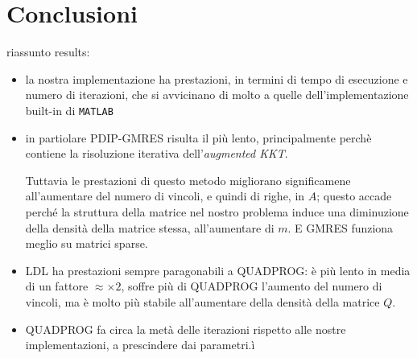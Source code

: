 \section{Conclusioni}
riassunto results:
\begin{itemize}
    \item la nostra implementazione ha prestazioni, in termini di tempo di esecuzione e numero di iterazioni, che si avvicinano di molto a quelle dell'implementazione built-in di \texttt{MATLAB}
    \item  in partiolare PDIP-GMRES risulta il più lento, principalmente perchè contiene la risoluzione iterativa dell'\textit{augmented KKT}. 
    
    Tuttavia le prestazioni di questo metodo migliorano significamene all'aumentare del numero di vincoli, e quindi di righe, in $A$; questo accade perché la struttura della matrice nel nostro problema induce una diminuzione della densità della matrice stessa, all'aumentare di $m$. E GMRES funziona meglio su matrici sparse.
    
    \item LDL ha prestazioni sempre paragonabili a QUADPROG: è più lento in media di un fattore $\approx\times2$, soffre più di QUADPROG l'aumento del numero di vincoli, ma è molto più stabile all'aumentare della densità della matrice $Q$.
    
    \item QUADPROG fa circa la metà delle iterazioni rispetto alle nostre implementazioni, a prescindere dai parametri.ì

\end{itemize}


